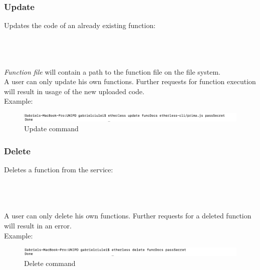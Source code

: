 \subsubsection{Update}
Updates the code of an already existing function:\\\\
\centerline {}\\\\
\textit{Function file} will contain a path to the function file on the file system.\\
A user can only update his own functions. Further requests for function execution will result in usage of the new uploaded code.\\
Example:
\begin{figure}[h]
	\begin{center}
	\includegraphics[width=\textwidth]{res/img/update}
	\caption{Update command}
	\end{center}
\end{figure}
\subsubsection{Delete}
Deletes a function from the service:\\\\
\centerline {}\\\\
A user can only delete his own functions. Further requests for a deleted function will result in an error.\\
Example:
\begin{figure}[h]
	\begin{center}
	\includegraphics[width=\textwidth]{res/img/delete}
	\caption{Delete command}
	\end{center}
\end{figure}
